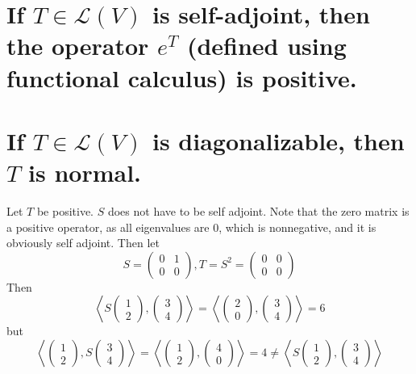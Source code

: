 \documentclass[answers]{exam}
\begin{document}
\begin{questions}
\begin{parts}
	\part{If $T \in \mathcal L(V)$ is self-adjoint, then the operator $e^T$ (defined using functional calculus) is positive.}
	\part{If $T \in \mathcal L(V)$ is diagonalizable, then $T$ is normal.}
\end{parts}

\begin{solution}
	Let $T$ be positive. $S$ does not have to be self adjoint. Note that the zero matrix is a positive operator, as all eigenvalues are 0, which is nonnegative, and it is obviously self adjoint. Then let
	$$S = \begin{pmatrix} 0 & 1 \\ 0 & 0 \end{pmatrix}, T = S^2 = \begin{pmatrix} 0 & 0 \\ 0 & 0 \end{pmatrix}$$
	Then
	$$\left\langle S\begin{pmatrix} 1 \\ 2 \end{pmatrix},\begin{pmatrix} 3 \\ 4 \end{pmatrix} \right\rangle = \left\langle \begin{pmatrix} 2 \\ 0 \end{pmatrix},\begin{pmatrix} 3 \\ 4 \end{pmatrix} \right\rangle = 6$$
	but
	$$\left\langle \begin{pmatrix} 1 \\ 2 \end{pmatrix},S\begin{pmatrix} 3 \\ 4 \end{pmatrix} \right\rangle = \left\langle \begin{pmatrix} 1 \\ 2 \end{pmatrix}, \begin{pmatrix} 4 \\ 0 \end{pmatrix} \right\rangle = 4 \neq \left\langle S\begin{pmatrix} 1 \\ 2 \end{pmatrix},\begin{pmatrix} 3 \\ 4 \end{pmatrix} \right\rangle$$

\end{solution}
\end{questions}
\end{document}
